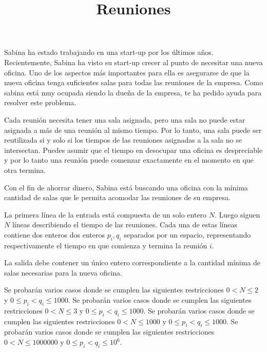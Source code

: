 \documentclass{oci}
\title{Reuniones}
\begin{document}
\begin{problemDescription}
  Sabina ha estado trabajando en una start-up por los últimos años.
  Recientemente, Sabina ha visto su start-up crecer al punto de necesitar una
  nueva oficina.
  Uno de los aspectos más importantes para ella es
  asegurarse de que la nueva oficina tenga suficientes salas para todas las
  reuniones de la empresa.
  Como sabina está muy ocupada siendo la dueña de la empresa, te ha pedido
  ayuda para resolver este problema.

  Cada reunión necesita tener una sala asignada, pero una sala no
  puede estar asignada a más de una reunión al mismo tiempo.
  Por lo tanto, una sala puede ser reutilizada si y solo si los tiempos de las
  reuniones asignadas a la sala no se intersectan.
  Puedes asumir que el tiempo en desocupar una oficina es despreciable y por
  lo tanto una reunión puede comenzar exactamente en el momento en que otra
  termina.

  Con el fin de ahorrar dinero, Sabina está buscando una oficina con la mínima
  cantidad de salas que le permita acomodar las reuniones de su empresa.
\end{problemDescription}

\begin{inputDescription}
    La primera línea de la entrada está compuesta de un solo entero $N$.
    Luego siguen $N$ líneas describiendo el tiempo de las reuniones.
    Cada una de estas líneas contiene dos enteros dos enteros $p_i, q_i$
    separados por un espacio, representando respectivamente el tiempo en que
    comienza y termina la reunión $i$.
\end{inputDescription}

\begin{outputDescription}
    La salida debe contener un único entero correspondiente a la cantidad
    mínima de salas necesarias para la nueva oficina.
\end{outputDescription}

\begin{scoreDescription}
  Se probarán varios casos donde se cumplen las siguientes restricciones $0 <
  N \leq 2$ y $0 \leq p_i< q_i \leq 1000$.
  Se probarán varios casos donde se cumplen las siguientes restricciones $0 <
  N \leq 3$ y $0 \leq p_i< q_i \leq 1000$.
  Se probarán varios casos donde se cumplen las siguientes restricciones $0 <
  N \leq 1000$ y $0 \leq p_i< q_i \leq 1000$.
  Se probarán varios casos donde se cumplen las siguientes restricciones $0 <
  N \leq 1000000$ y $0 \leq p_i< q_i \leq 10^6$.
\end{scoreDescription}

\begin{sampleDescription}
\end{sampleDescription}
\end{document}
